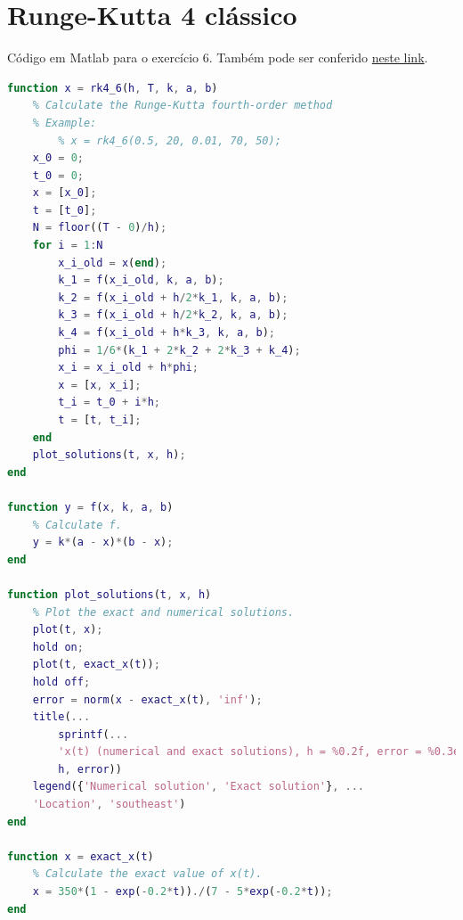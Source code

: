 \documentclass{article}
\begin{document}
    \section{Runge-Kutta 4 clássico}
        \label{appendix:runge_kutta}

        Código em Matlab para o exercício 6. Também pode ser conferido
        \href{https://github.com/lucasresck/introduction-to-numerical-analysis/blob/master/list_4/rk4_6.m}{neste link}.

        \begin{lstlisting}[language=Matlab]
function x = rk4_6(h, T, k, a, b)
    % Calculate the Runge-Kutta fourth-order method
    % Example:
        % x = rk4_6(0.5, 20, 0.01, 70, 50);
    x_0 = 0;
    t_0 = 0;
    x = [x_0];
    t = [t_0];
    N = floor((T - 0)/h);
    for i = 1:N
        x_i_old = x(end);
        k_1 = f(x_i_old, k, a, b);
        k_2 = f(x_i_old + h/2*k_1, k, a, b);
        k_3 = f(x_i_old + h/2*k_2, k, a, b);
        k_4 = f(x_i_old + h*k_3, k, a, b);
        phi = 1/6*(k_1 + 2*k_2 + 2*k_3 + k_4);
        x_i = x_i_old + h*phi;
        x = [x, x_i];
        t_i = t_0 + i*h;
        t = [t, t_i];
    end
    plot_solutions(t, x, h);
end

function y = f(x, k, a, b)
    % Calculate f.
    y = k*(a - x)*(b - x);
end

function plot_solutions(t, x, h)
    % Plot the exact and numerical solutions.
    plot(t, x);
    hold on;
    plot(t, exact_x(t));
    hold off;
    error = norm(x - exact_x(t), 'inf');
    title(...
        sprintf(...
        'x(t) (numerical and exact solutions), h = %0.2f, error = %0.3e', ...
        h, error))
    legend({'Numerical solution', 'Exact solution'}, ...
    'Location', 'southeast')
end

function x = exact_x(t)
    % Calculate the exact value of x(t).
    x = 350*(1 - exp(-0.2*t))./(7 - 5*exp(-0.2*t));
end
        \end{lstlisting}
\end{document}
